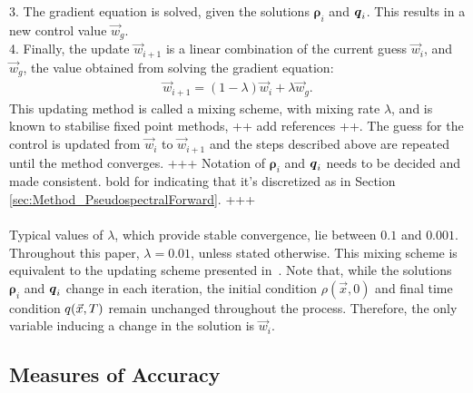3. The gradient equation is solved, given the solutions $\boldsymbol\rho_i$ and $\boldsymbol {q}_i$. This results in a new control value $\vec{w}_g$. \\
4. Finally, the update $\vec{w}_{i+1}$ is a linear combination of the current guess $\vec{w}_i$, and $\vec{w}_{g}$, the value obtained from solving the gradient equation:
\begin{align*}
\vec{w}_{i+1} = (1-\lambda)\vec{w}_{i} + \lambda \vec{w}_{g}.
\end{align*}
This updating method is called a mixing scheme, with mixing rate $\lambda$, and is known to stabilise fixed point methods, ++ add references ++.
The guess for the control is updated from $\vec{w}_i$ to $\vec{w}_{i+1}$ and the steps described above are repeated until the method converges. 
+++ Notation of $\boldsymbol \rho_i$ and $\boldsymbol {q}_i$ needs to be decided and made consistent. bold for indicating that it's discretized as in Section \ref{sec:Method_PseudospectralForward}. +++
\\
\\
Typical values of $\lambda$, which provide stable convergence, lie between $0.1$ and $0.001$. Throughout this paper, $\lambda =0.01$, unless stated otherwise. This mixing scheme is equivalent to the updating scheme presented in~\cite{Burger1}. 
Note that, while the solutions $\boldsymbol\rho_i$ and $\boldsymbol {q}_i$ change in each iteration, the initial condition $\rho(\vec{x},0)$ and final time condition $q(\vec{x},T)$ remain unchanged throughout the process. Therefore, the only variable inducing a change in the solution is $\vec{w}_i$.




\subsection{Measures of Accuracy}\label{sec:Method_Validation}

